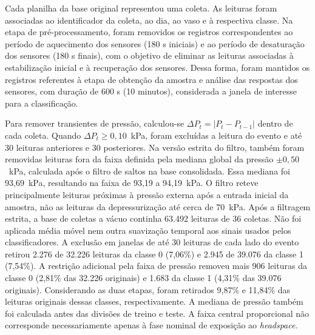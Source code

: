 Cada planilha da base original representou uma coleta. As leituras foram associadas ao identificador da coleta, ao dia, ao vaso e à respectiva classe. Na etapa de pré-processamento, foram removidos os registros correspondentes ao período de aquecimento dos sensores (180 s iniciais) e ao período de desaturação dos sensores (180 s finais), com o objetivo de eliminar as leituras associadas à estabilização inicial e à recuperação dos sensores. Dessa forma, foram mantidos os registros referentes à etapa de obtenção da amostra e análise das respostas dos sensores, com duração de 600 s (10 minutos), considerada a janela de interesse para a classificação.

Para remover transientes de pressão, calculou-se
$\Delta P_t=|P_t-P_{t-1}|$ dentro de cada coleta. Quando
$\Delta P_t\geq 0{,}10$~kPa, foram excluídas a leitura do evento e até
30 leituras anteriores e 30 posteriores. Na versão estrita do filtro,
também foram removidas leituras fora da faixa definida pela mediana global
da pressão $\pm 0{,}50$~kPa, calculada após o filtro de saltos na base
consolidada. Essa mediana foi 93,69~kPa, resultando na faixa de
93,19 a 94,19~kPa. O filtro reteve principalmente leituras próximas à
pressão externa após a entrada inicial da amostra, não as leituras da
depressurização até cerca de 70~kPa. Após a
filtragem estrita, a base de coletas a vácuo continha 63.492 leituras de
36 coletas. Não foi aplicada média móvel nem outra suavização temporal
aos sinais usados pelos classificadores.
A exclusão em janelas de até 30 leituras de cada lado do evento retirou
2.276 de 32.226 leituras da classe 0 (7,06\%) e 2.945 de 39.076 da
classe 1 (7,54\%). A restrição adicional pela faixa de pressão removeu
mais 906 leituras da classe 0 (2,81\% das 32.226 originais) e 1.683 da
classe 1 (4,31\% das 39.076 originais). Considerando as duas
etapas, foram retirados 9,87\% e 11,84\% das leituras originais dessas
classes, respectivamente.
A mediana de pressão também foi calculada antes das divisões de treino e
teste. A faixa central proporcional não corresponde necessariamente apenas
à fase nominal de exposição ao \textit{headspace}.

